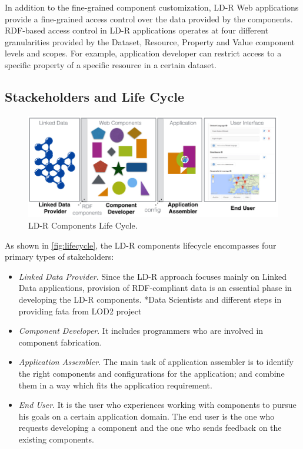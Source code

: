 \documentclass{acm_proc_article-sp}
\begin{document}
In addition to the fine-grained component customization, LD-R Web applications provide a fine-grained access control over the data provided by the components.
RDF-based access control in LD-R applications operates at four different granularities provided by the Dataset, Resource, Property and Value component levels and scopes.
For example, application developer can restrict access to a specific property of a specific resource in a certain dataset.

\subsection{Stackeholders and Life Cycle}
\begin{figure}[tb]
  \includegraphics[width=1\linewidth]{images/lifecycle.jpg}
  \caption{LD-R Components Life Cycle.}
  \label{fig:lifecycle}
\end{figure}

As shown in \autoref{fig:lifecycle}, the LD-R components lifecycle encompasses four primary types of stakeholders:

\begin{itemize}

\item \emph{Linked Data Provider}.
Since the LD-R approach focuses mainly on Linked Data applications, provision of RDF-compliant data is an essential phase in developing the LD-R components.
*Data Scientists and different steps in providing fata from LOD2 project

\item \emph{Component Developer}. 
It includes programmers who are involved in component fabrication.


\item \emph{Application Assembler}.
The main task of application assembler is to identify the right components and configurations for the application; and combine them in a way which fits the application requirement. 

\item \emph{End User}. 
It is the user who experiences working with components to pursue his goals on a certain application domain.
The end user is the one who requests developing a component and the one who sends feedback on the existing components.

\end{itemize}
\end{document}

